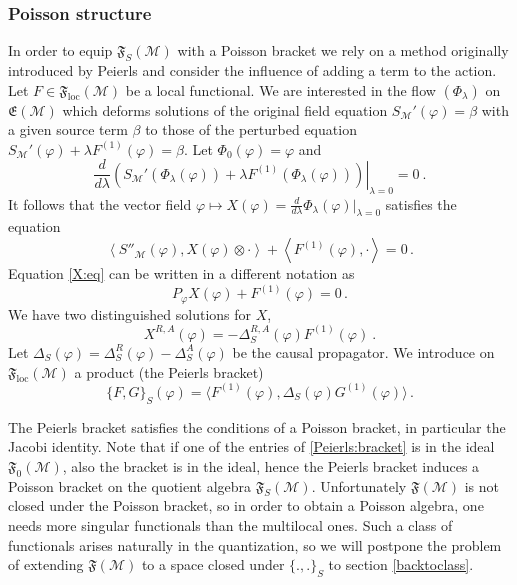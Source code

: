 \documentclass[11pt]{article}
\newcommand{\F}{\mathfrak{F}}
\newcommand{\Mcal}{\mathcal{M}}
\newcommand{\loc}{\mathrm{loc}}
\newcommand{\la}{\lambda}
\newcommand{\ph}{\varphi}
\newcommand{\Poi}[2]{\{#1,#2\}}
\newcommand{\1}{\mathds{1}}                         %
\newcommand{\be}{\begin{equation}}
\newcommand{\ee}{\end{equation}}
\begin{document}
{\subsubsection{Poisson structure}\label{Poisson}
In order to equip $\mathfrak{F}_S(\Mcal)$ with a Poisson bracket we rely on a method originally introduced by Peierls and consider the influence of adding a term to the action. Let $F\in\mathfrak{F}_\loc(\Mcal)$ be a local functional. We are interested in the flow $(\Phi_{\lambda})$ on $\mathfrak{E}(\Mcal)$ which deforms solutions of the original field equation $S_\Mcal'(\ph)=\beta$ with a given source term $\beta$ to those of the perturbed equation $S_\Mcal'(\ph)+\lambda F^{(1)}(\ph)=\beta$. Let $\Phi_0(\ph)=\ph$ and 
\be\label{flow}
\frac{d}{d\lambda}\left.\left(S_\Mcal'(\Phi_{\lambda}(\ph))+\la F^{(1)}(\Phi_{\lambda}(\ph))\right)\right|_{\lambda=0}=0 \ .
\ee
It follows that the vector field $\ph\mapsto X(\ph)=\frac{d}{d\lambda}\Phi_{\lambda}(\ph)|_{\lambda=0}$ satisfies the equation
\be\label{X:eq}
\left<S''_\Mcal(\ph),X(\ph)\otimes\cdot\right>+\left<F^{(1)}(\ph),\cdot\right>=0\,.
\ee
Equation \eqref{X:eq} can be written in a different notation as
\[
P_{\ph}X(\ph)+F^{(1)}(\ph)=0\,.
\]
We have two distinguished solutions for  $X$,
\be
X^{R,A}(\ph)=-\Delta_S^{R,A}(\ph)F^{(1)}(\ph)\ .
\ee
Let $\Delta_S(\ph)=\Delta^R_S(\ph)-\Delta^A_S(\ph)$ be the causal propagator. We introduce on $\mathfrak{F}_\loc(\Mcal)$ a product (the Peierls bracket)
\be\label{Peierls:bracket}
\Poi{F}{G}_S(\ph)=\langle F^{(1)}(\ph), \Delta_S(\ph)G^{(1)}(\ph)\rangle\,.
\ee

The Peierls bracket satisfies the conditions of a Poisson bracket, in particular the Jacobi identity. Note that if one of the entries of \eqref{Peierls:bracket} is in the ideal $\mathfrak{F}_0(\Mcal)$, also the bracket is in the ideal, hence the Peierls bracket induces a Poisson bracket on the quotient algebra $\F_S(\Mcal)$. Unfortunately $\F(\Mcal)$ is not closed under the Poisson bracket, so in order to obtain a Poisson algebra, one needs more singular functionals than the multilocal ones. Such a class of functionals arises naturally in the quantization, so we will postpone the problem of extending $\F(\Mcal)$ to a space closed under $\Poi{.}{.}_S$ to section \ref{backtoclass}.
}
\end{document}
